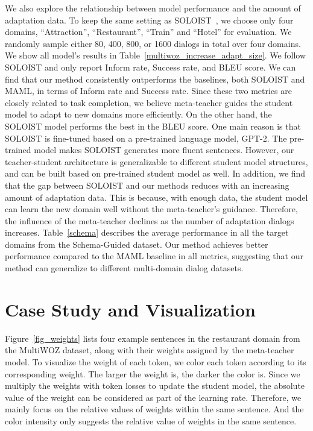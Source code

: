 \documentclass[letterpaper]{article}
\begin{document}
We also explore the relationship between model performance and the amount of adaptation data. To keep the same setting as SOLOIST~\citep{Peng2020SOLOISTFT}, we choose only four domains, ``Attraction'', ``Restaurant'', ``Train'' and ``Hotel'' for evaluation. We randomly sample either 80, 400, 800, or 1600 dialogs in total over four domains. We show all model's results in Table~\ref{multiwoz_increase_adapt_size}. We follow SOLOIST and only report Inform rate, Success rate, and BLEU score.
We can find that our method consistently outperforms the baselines, both SOLOIST and MAML, in terms of Inform rate and Success rate. Since these two metrics are closely related to task completion, we believe meta-teacher guides the student model to adapt to new domains more efficiently.
On the other hand, the SOLOIST model performs the best in the BLEU score. One main reason is that SOLOIST is fine-tuned based on a pre-trained language model, GPT-2. The pre-trained model makes SOLOIST generates more fluent sentences. However, our teacher-student architecture is generalizable to different student model structures, and can be built based on pre-trained student model as well.
In addition, we find that the gap between SOLOIST and our methods reduces with an increasing amount of adaptation data. This is because, with enough data, the student model can learn the new domain well without the meta-teacher's guidance. Therefore, the influence of the meta-teacher declines as the number of adaptation dialogs increases.  Table~\ref{schema} describes the average performance in all the target domains from the Schema-Guided dataset. Our method achieves better performance compared to the MAML baseline in all metrics, suggesting that our method can generalize to different multi-domain dialog datasets.






\section*{Case Study and Visualization}
Figure~\ref{fig_weights} lists four example sentences in the restaurant domain from  the MultiWOZ dataset, along with their weights assigned by the meta-teacher model.
To visualize the weight of each token, we color each token according to its corresponding weight.
The larger the weight is, the darker the color is.
Since we multiply the weights with token losses to update the student model, the absolute value of the weight can be considered as part of the learning rate.
Therefore, we mainly focus on the relative values of weights within the same sentence.
And the color intensity only suggests the relative value of weights in the same sentence.
\end{document}
